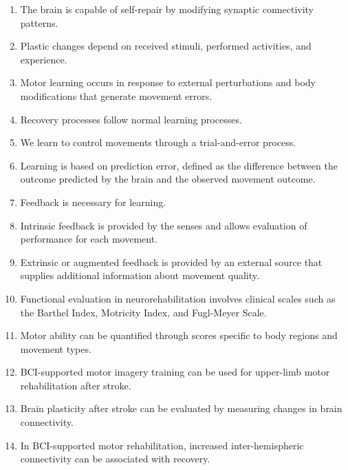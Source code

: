 \begin{enumerate}[label=\arabic*.]
    \item The brain is capable of self-repair by modifying synaptic connectivity patterns.
    
    \item Plastic changes depend on received stimuli, performed activities, and experience.
    
    \item Motor learning occurs in response to external perturbations and body modifications that generate movement errors.
    
    \item Recovery processes follow normal learning processes.
    
    \item We learn to control movements through a trial-and-error process.
    
    \item Learning is based on prediction error, defined as the difference between the outcome predicted by the brain and the observed movement outcome.
    
    \item Feedback is necessary for learning.
    
    \item Intrinsic feedback is provided by the senses and allows evaluation of performance for each movement.
    
    \item Extrinsic or augmented feedback is provided by an external source that supplies additional information about movement quality.
    
    \item Functional evaluation in neurorehabilitation involves clinical scales such as the Barthel Index, Motricity Index, and Fugl-Meyer Scale.
    
    \item Motor ability can be quantified through scores specific to body regions and movement types.
    
    \item BCI-supported motor imagery training can be used for upper-limb motor rehabilitation after stroke.
    
    \item Brain plasticity after stroke can be evaluated by measuring changes in brain connectivity.
    
    \item In BCI-supported motor rehabilitation, increased inter-hemispheric connectivity can be associated with recovery.
    

\end{enumerate}
